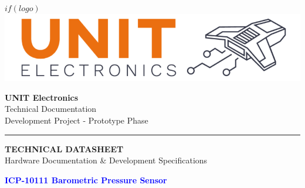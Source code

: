 \documentclass[11pt,a4paper]{article}
\begin{document}
\begin{titlepage}
    \centering
    
    \vspace*{0.5cm}
    
    \begin{minipage}{0.3\textwidth}
        \centering
        $if(logo)$
        \includegraphics[width=\textwidth]{logo.png}
        
    \end{minipage}
    \hfill
    \begin{minipage}{0.6\textwidth}
        \raggedleft
        {\small \textbf{UNIT Electronics}}\\
        {\footnotesize Technical Documentation}\\
        {\footnotesize Development Project - Prototype Phase}
    \end{minipage}
    
    \vspace{0.5cm}
    
    {\color{blue}\rule{\textwidth}{2pt}}
    
    \vspace{1.5cm}
    
    \begin{tcolorbox}[
        colback=blue!5!white,
        colframe=blue!75!black,
        width=0.9\textwidth,
        arc=2mm,
        boxrule=1.5pt,
        halign=center
    ]
    {\Large \textbf{TECHNICAL DATASHEET}}\\[0.2cm]
    {\normalsize Hardware Documentation \& Development Specifications}
    \end{tcolorbox}
    
    \vspace{0.8cm}
    
    {\Huge \textbf{\textcolor{blue}{ICP-10111 Barometric Pressure Sensor}}}\\[0.3cm]
    
    

\end{titlepage}
\end{document}
